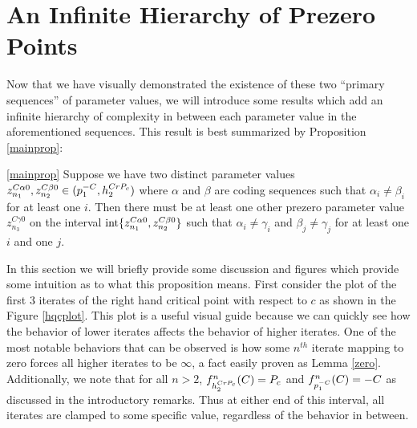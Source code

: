 \section{An Infinite Hierarchy of Prezero Points}

Now that we have visually demonstrated the existence of these two ``primary sequences'' of parameter values, we will introduce some results which add an infinite hierarchy of complexity in between each parameter value in the aforementioned sequences. This result is best summarized by Proposition \ref{mainprop}:

\begin{customthm}{\ref{mainprop}}
	Suppose we have two distinct parameter values $z_{n_1}^{C\alpha0}, z_{n_2}^{C\beta0} \in (p^{-C}_1, h^{CrP_c}_2)$ where $\alpha$ and $\beta$ are coding sequences such that $\alpha_i \neq \beta_i$ for at least one $i$. Then there must be at least one other prezero parameter value $z_{n_3}^{C\gamma0}$ on the interval $\text{int}\{z_{n_1}^{C\alpha0},z_{n_2}^{C\beta0}\}$ such that $\alpha_i \neq \gamma_i$ and $\beta_j \neq \gamma_j$ for at least one $i$ and one $j$.
\end{customthm}


In this section we will briefly provide some discussion and figures which provide some intuition as to what this proposition means. First consider the plot of the first 3 iterates of the right hand critical point with respect to $c$ as shown in the Figure \ref{hqcplot}. This plot is a useful visual guide because we can quickly see how the behavior of lower iterates affects the behavior of higher iterates. One of the most notable behaviors that can be observed is how some $n^{th}$ iterate mapping to zero forces all higher iterates to be $\infty$, a fact easily proven as Lemma \ref{zero}. Additionally, we note that for all $n > 2$, $f^n_{h^{CrP_c}_2} (C) = P_c$ and $f^n_{p^{-C}_1} (C) = -C$ as discussed in the introductory remarks. Thus at either end of this interval, all iterates are clamped to some specific value, regardless of the behavior in between.

